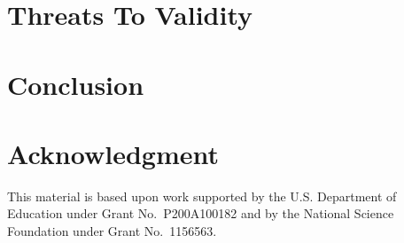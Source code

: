 \documentclass[conference]{IEEEtran}
\begin{document}
\section{Threats To Validity}
\label{sec:threats}


\section{Conclusion}
\label{sec:conclusion}


\section*{Acknowledgment}
This material is based upon work supported
by the U.S. Department of Education under Grant No.\ P200A100182 and
by the National Science Foundation under Grant No.\ 1156563.



\end{document}
